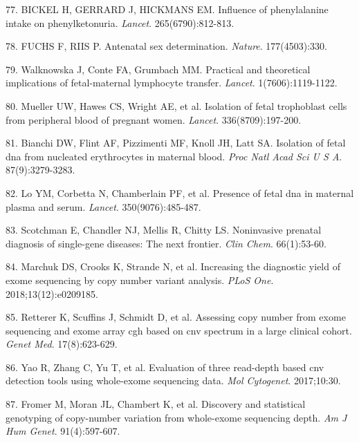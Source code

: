 \documentclass[11pt,letterpaper]{book}
\begin{document}
\leavevmode\hypertarget{ref-bickel:1953aa}{}%
77. BICKEL H, GERRARD J, HICKMANS EM. Influence of phenylalanine intake on phenylketonuria. \emph{Lancet}. 265(6790):812-813.

\leavevmode\hypertarget{ref-fuchs:1956aa}{}%
78. FUCHS F, RIIS P. Antenatal sex determination. \emph{Nature}. 177(4503):330.

\leavevmode\hypertarget{ref-walknowska:1969aa}{}%
79. Walknowska J, Conte FA, Grumbach MM. Practical and theoretical implications of fetal-maternal lymphocyte transfer. \emph{Lancet}. 1(7606):1119-1122.

\leavevmode\hypertarget{ref-mueller:1990aa}{}%
80. Mueller UW, Hawes CS, Wright AE, et al. Isolation of fetal trophoblast cells from peripheral blood of pregnant women. \emph{Lancet}. 336(8709):197-200.

\leavevmode\hypertarget{ref-bianchi:1990aa}{}%
81. Bianchi DW, Flint AF, Pizzimenti MF, Knoll JH, Latt SA. Isolation of fetal dna from nucleated erythrocytes in maternal blood. \emph{Proc Natl Acad Sci U S A}. 87(9):3279-3283.

\leavevmode\hypertarget{ref-lo:1997aa}{}%
82. Lo YM, Corbetta N, Chamberlain PF, et al. Presence of fetal dna in maternal plasma and serum. \emph{Lancet}. 350(9076):485-487.

\leavevmode\hypertarget{ref-scotchman:2020aa}{}%
83. Scotchman E, Chandler NJ, Mellis R, Chitty LS. Noninvasive prenatal diagnosis of single-gene diseases: The next frontier. \emph{Clin Chem}. 66(1):53-60.

\leavevmode\hypertarget{ref-marchuk:2018aa}{}%
84. Marchuk DS, Crooks K, Strande N, et al. Increasing the diagnostic yield of exome sequencing by copy number variant analysis. \emph{PLoS One}. 2018;13(12):e0209185.

\leavevmode\hypertarget{ref-retterer:2015aa}{}%
85. Retterer K, Scuffins J, Schmidt D, et al. Assessing copy number from exome sequencing and exome array cgh based on cnv spectrum in a large clinical cohort. \emph{Genet Med}. 17(8):623-629.

\leavevmode\hypertarget{ref-yao:2017aa}{}%
86. Yao R, Zhang C, Yu T, et al. Evaluation of three read-depth based cnv detection tools using whole-exome sequencing data. \emph{Mol Cytogenet}. 2017;10:30.

\leavevmode\hypertarget{ref-fromer:2012aa}{}%
87. Fromer M, Moran JL, Chambert K, et al. Discovery and statistical genotyping of copy-number variation from whole-exome sequencing depth. \emph{Am J Hum Genet}. 91(4):597-607.
\end{document}
